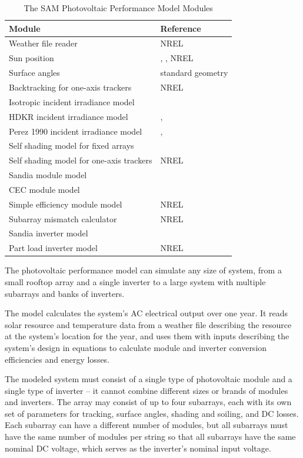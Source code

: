 \documentclass[12pt,letterpaper]{article}
\begin{document}
\begin{table}
\begin{center}
\caption{The SAM Photovoltaic Performance Model Modules}
\begin{tabular}{ll}
\midrule
Module & Reference\\
\midrule
Weather file reader & NREL\\
Sun position & \citet{michalsky1988}, \citet{iqbal1983}, NREL\\
Surface angles & standard geometry\\
Backtracking for one-axis trackers & NREL\\
Isotropic incident irradiance model & \citet{liu1963}\\
HDKR incident irradiance model & \citet{duffie2013}, \citet{reindl1988}\\
Perez 1990 incident irradiance model & \citet{perez1988}, \citet{perez1990}\\
Self shading model for fixed arrays & \citet{deline2013a}\\
Self shading model for one-axis trackers & NREL \\
Sandia module model & \citet{king2004}\\
CEC module model & \citet{desoto2004a}\\
Simple efficiency module model & NREL\\
Subarray mismatch calculator & NREL \\
Sandia inverter model & \citet{king2007}\\
Part load inverter model & NREL\\
\hline
\end{tabular}
\label{tab-submodels}
\end{center}
\end{table}

The photovoltaic performance model can simulate any size of system, from a small rooftop array and a single inverter to a large system with multiple subarrays and banks of inverters.

The model calculates the system's AC electrical output over one year. It reads solar resource and temperature data from a weather file describing the resource at the system's location for the year, and uses them with inputs describing the system's design in equations to calculate module and inverter conversion efficiencies and energy losses.

The modeled system must consist of a single type of photovoltaic module and a single type of inverter -- it cannot combine different sizes or brands of modules and inverters. The array may consist of up to four subarrays, each with its own set of parameters for tracking, surface angles, shading and soiling, and DC losses. Each subarray can have a different number of modules, but all subarrays must have the same number of modules per string so that all subarrays have the same nominal DC voltage, which serves as the inverter's nominal input voltage.
\end{document}
